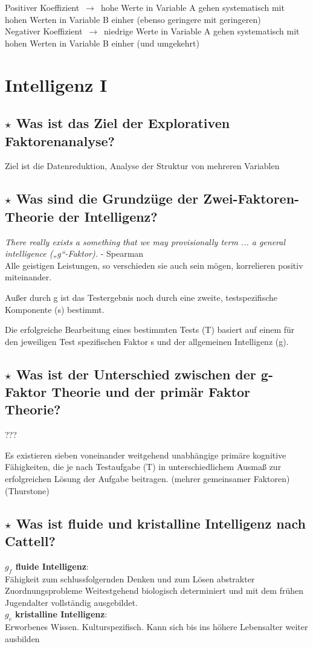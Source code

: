 \documentclass[a4paper,9pt,DIV=14]{scrartcl}
\begin{document}
    Positiver Koeffizient  $\,\to\,$ hohe Werte in Variable A gehen systematisch mit hohen Werten in Variable B einher (ebenso geringere mit geringeren)\\
    Negativer Koeffizient  $\,\to\,$ niedrige Werte in Variable A gehen systematisch mit hohen Werten in Variable B einher (und umgekehrt)

\section{Intelligenz I}

\subsection{$\star$ Was ist das Ziel der Explorativen Faktorenanalyse?} %
Ziel ist die Datenreduktion, Analyse der Struktur von mehreren Variablen
\subsection{$\star$ Was sind die Grundzüge der Zwei-Faktoren-Theorie der Intelligenz?} %
\textit{There really exists a something that we may provisionally term ... a general intelligence („g“-Faktor).} - Spearman\\

Alle geistigen Leistungen, so verschieden sie auch sein mögen, korrelieren positiv miteinander.

Außer durch g ist das Testergebnis noch durch eine zweite, testspezifische Komponente (s) bestimmt.

Die erfolgreiche Bearbeitung eines bestimmten Tests (T) basiert auf einem für den jeweiligen Test spezifischen Faktor s und der allgemeinen Intelligenz (g).
\subsection{$\star$ Was ist der Unterschied zwischen der g-Faktor Theorie und der primär Faktor Theorie?} %
???

Es existieren sieben voneinander weitgehend unabhängige primäre kognitive Fähigkeiten, die je nach Testaufgabe (T) in unterschiedlichem Ausmaß zur erfolgreichen Lösung der Aufgabe beitragen.
    (mehrer gemeinsamer Faktoren) (Thurstone)
\subsection{$\star$ Was ist fluide und kristalline Intelligenz nach Cattell?} %
    \textbf{$g_f$ fluide Intelligenz}:\\
    Fähigkeit zum schlussfolgernden Denken und zum Lösen abstrakter Zuordnungsprobleme
    Weitestgehend biologisch determiniert und mit dem frühen Jugendalter vollständig ausgebildet.\\
    \textbf{$g_c$ kristalline Intelligenz}:\\
    Erworbenes Wissen. Kulturspezifisch. Kann sich bis ins höhere Lebensalter weiter ausbilden
\end{document}
